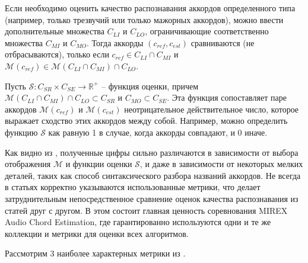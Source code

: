 Если необходимо оценить качество распознавания аккордов определенного типа
(например, только трезвучий или только мажорных аккордов), можно ввести
дополнительные множества $C_{LI}$ и $C_{LO}$, ограничивающие соответственно
множества $C_{MI}$ и $C_{MO}$. Тогда аккорды $(c_{ref}, c_{est})$ сравниваются
(не отбрасываются), только если $c_{ref} \in C_{LI} \cap C_{MI}$ и
$\mathcal{M}(c_{ref}) \in \mathcal{M}(C_{LI} \cap C_{MI}) \cap C_{LO}$.

Пусть $\mathcal{S}:C_{SR} \times C_{SE} \to \mathbb{R}^+$ -- функция оценки,
причем $\mathcal{M}(C_{LI} \cap C_{MI}) \cap C_{LO} \subset C_{SR}$ и $C_{MO}
\subset C_{SE}$. Эта функция сопоставляет паре аккордов $\mathcal{M}(c_{ref})$ и
$\mathcal{M}(c_{est})$ неотрицательное действительное число, которое выражает
сходство этих аккордов между собой. Например, можно определить функцию
$\mathcal{S}$ как равную 1 в случае, когда аккорды совпадают, и 0 иначе.

Как видно из \cite{Pauwels2013}, полученные цифры сильно различаются в
зависимости от выбора отображения $\mathcal{M}$ и функции оценки $\mathcal{S}$,
и даже в зависимости от некоторых мелких деталей, таких как способ
синтаксического разбора названий аккордов. Не всегда в статьях корректно
указываются использованные метрики, что делает затруднительным непосредственное
сравнение оценок качества распознавания из статей друг с другом. В этом состоит
главная ценность соревнования MIREX Audio Chord Estimation, где гарантированно
используются одни и те же коллекции и метрики для оценки всех алгоритмов.

Рассмотрим 3 наиболее характерных метрики из \cite{Pauwels2013}.

